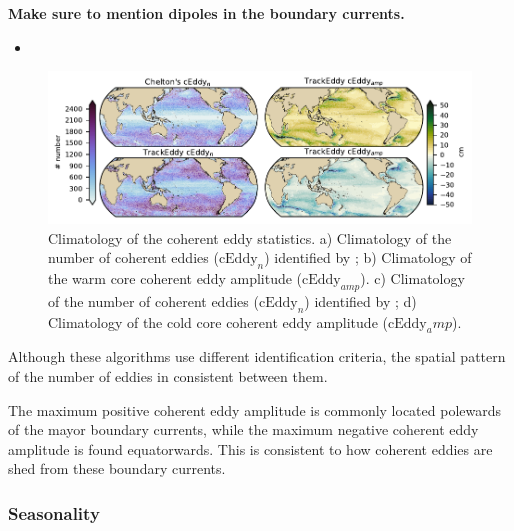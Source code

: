 \documentclass[draft]{agujournal2019}
\newcommand{\cEddy}{\textrm{cEddy}}
\begin{document}
	\textbf{Make sure to mention dipoles in the boundary currents.}

    \begin{itemize}
		\item 
	\end{itemize}

	\begin{figure}
	    \centering
	    \includegraphics[width=1\textwidth]{figures/global_stats_polarity.pdf}
	    \caption{Climatology of the coherent eddy statistics. a) Climatology of the number of coherent eddies ($\cEddy_n$) identified by \citet{Chelton_Global_2007}; b) Climatology of the warm core coherent eddy amplitude ($\cEddy_{amp}$). c) Climatology of the number of coherent eddies ($\cEddy_n$) identified by \citet{Martinez_Kinetic_2019}; d) Climatology of the cold core coherent eddy amplitude ($\cEddy_amp$).}
	    \label{fig:my_label}
	\end{figure}

	Although these algorithms use different identification criteria, the spatial pattern of the number of eddies in consistent between them.

	The maximum positive coherent eddy amplitude is commonly located polewards of the mayor boundary currents, while the maximum negative coherent eddy amplitude is found equatorwards. This is consistent to how coherent eddies are shed from these boundary currents.

	\subsubsection{Seasonality}
\end{document}
